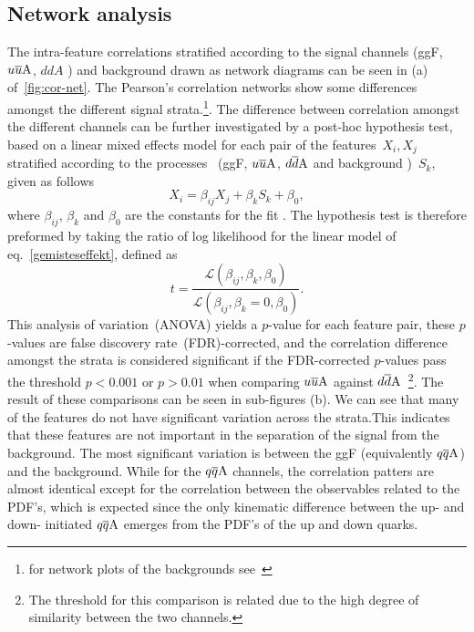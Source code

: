 \subsection{Network analysis}
The intra-feature correlations stratified according to the signal channels (ggF, $u\overline u \rm A$, $ddA$ ) and background drawn as network diagrams can be seen in (a) of~\autoref{fig:cor-net}. The Pearson's correlation networks show some differences amongst the different signal strata.\footnote{for network plots of the backgrounds see~\cite{Grojean:2020ech}}. The difference between correlation amongst the different channels can be further investigated by a post-hoc hypothesis test, based on a linear mixed effects model for each pair of the features~$X_i, X_j$ stratified according to the processes ~(ggF, $u\overline u \rm A$, $d\overline d \rm A$ and background )~$S_k$, given as follows
\begin{equation}
X_i = \beta_{ij} X_j + \beta_k S_k + \beta_0,
\label{gemisteseffekt}
\end{equation}
where $\beta_{ij}$, $\beta_k$ and $\beta_0$ are the constants for the fit . The hypothesis test is therefore preformed by taking  the ratio of log likelihood for the linear model of eq.~\eqref{gemisteseffekt}, defined as
\begin{equation}
	t = \frac{\mathscr{L} (\beta_{ij},\beta_k,\beta_0) }{\mathscr{L}(\beta_{ij},\beta_k=0,\beta_0)}.
\end{equation}
This analysis of variation~(ANOVA) yields a $p$-value for each feature pair, these $p$-values are false discovery rate~(FDR)-corrected, and the correlation difference amongst the strata is considered significant if the FDR-corrected $p$-values pass the threshold $ p<0.001$ or $p>0.01$ when comparing $u\overline u \rm A$ against $d\overline d \rm A$~\footnote{The threshold for this comparison is related due to the high degree of similarity between the two channels.}. The result of these comparisons can be seen in sub-figures (b). We can see that many of the features do not have significant variation across the strata.This indicates that these features are not important in the separation of the signal from the background. The most significant variation is between the ggF (equivalently $q\overline q \rm A$) and the background. While for the $q\overline q \rm A$ channels, the correlation patters are almost identical except for the correlation between the observables related to the PDF's, which is expected since the only kinematic difference between the up- and down- initiated $q\overline q \rm A$ emerges from the PDF's of the up and down quarks. \\
